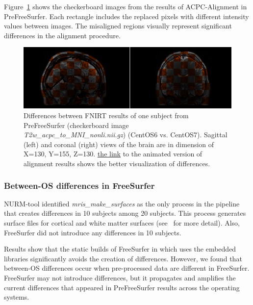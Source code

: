 \documentclass[a4paper,num-refs]{oup-contemporary}
\begin{document}
Figure~\ref{fig:fnirt_result} 
shows the checkerboard images from the results of ACPC-Alignment in PreFreeSurfer. 
Each rectangle includes the replaced pixels with different intensity values between images.
The misaligned regions visually represent significant differences in the alignment 
procedure.


\begin{figure}
  \centering
    \includegraphics[width=\columnwidth]{images/t2w_alignment.png} 
    \caption{Differences between FNIRT results of one subject from PreFreeSurfer 
    (checkerboard image \emph{T2w\_acpc\_to\_MNI\_nonli.nii.gz}) (CentOS6 vs. 
    CentOS7). Sagittal (left) and coronal (right) views of the brain are in dimension of X=130, Y=155, Z=130.
    \href{https://github.com/ali4006/HCP-reproducibility-paper/blob/master/images/pfs_t2w_alignment.gif}
    {the link} to the animated version of alignment results shows the better visualization of differences.
} 
    \label{fig:fnirt_result}
\end{figure}


\subsubsection{Between-OS differences in FreeSurfer} 

NURM-tool identified \emph{mris\_make\_surfaces} as the only process in 
the pipeline that creates differences in 10 subjects among 20 subjects.
This process generates surface files for cortical and white matter surfaces 
(see~\cite{fischl2012freesurfer} for more detail). 
Also, FreeSurfer did not introduce any differences in 10 subjects. 

Results show that the static builds of FreeSurfer in which uses the embedded libraries 
significantly avoids the creation of differences.
However, we found that between-OS differences occur when pre-processed data are different in FreeSurfer. 
FreeSurfer may not introduce differences, but it propagates and amplifies 
the current differences that appeared in PreFreeSurfer results across the operating systems.
\end{document}
